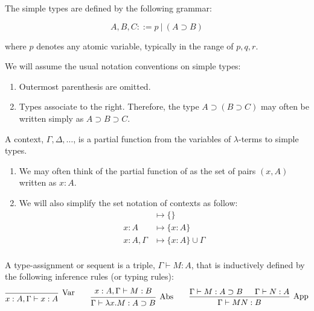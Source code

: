 \cite{Barendregt2013}

\begin{definition}
	The simple types are defined by the following grammar:
	
	\[
		A, B, C ::= p \ | \ (A \supset B)
	\]
	
	where $p$ denotes any atomic variable, typically in the range of $p, q, r$.
\end{definition}

\begin{notation}
	We will assume the usual notation conventions on simple types:
	
	\begin{enumerate}
		\item Outermost parenthesis are omitted.
		\item Types associate to the right. Therefore, the type $A \supset (B \supset C)$ may often be written simply as $A \supset B \supset C$.
	\end{enumerate}
\end{notation}

\begin{definition}[Context]
	A context, $\Gamma, \Delta, \dots$, is a partial function from the variables of $\lambda$-terms to simple types.
\end{definition}

\begin{notation} \hfill
	\begin{enumerate}
		\item We may often think of the partial function of as the set of pairs $(x, A)$ written as $x:A$.
		\item We will also simplify the set notation of contexts as follow:
		\begin{align*}
			            &\mapsto \{ \} \\
			x:A         &\mapsto \{ x:A \} \\
			x:A, \Gamma &\mapsto \{ x:A \} \cup \Gamma \\
		\end{align*}
	\end{enumerate}
\end{notation}

\begin{definition}
	A type-assignment or sequent is a triple, $\Gamma \vdash M:A$, that is inductively defined by the following inference rules (or typing rules):
	\[
	\begin{prooftree}
		\infer0[Var]{ x:A, \Gamma \vdash x:A } 
	\end{prooftree}
	\qquad
	\begin{prooftree}
		\hypo{ x:A, \Gamma \vdash M:B }
		\infer1[Abs]{ \Gamma \vdash \lambda x . M : A \supset B  } 
	\end{prooftree}
	\qquad
	\begin{prooftree}
		\hypo{ \Gamma \vdash M : A \supset B }
		\hypo{ \Gamma \vdash N : A }	
		\infer2[App]{ \Gamma \vdash M N : B } 
	\end{prooftree}
	\]
\end{definition}

